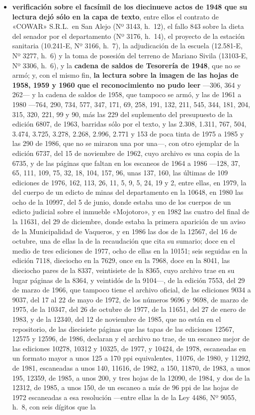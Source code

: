 \begin{itemize}[leftmargin=*]
\item \textbf{verificación sobre el facsímil de los diecinueve actos de 1948 que su lectura dejó sólo en la capa de texto}, entre ellos el contrato de «COWAR» S.R.L.\ en San Alejo (Nº 3143, h.\ 12), el fallo 843 sobre la dieta del senador por el departamento (Nº 3176, h.\ 14), el proyecto de la estación sanitaria (10.241-E, Nº 3166, h.\ 7), la adjudicación de la escuela (12.581-E, Nº 3277, h.\ 6) y la toma de posesión del terreno de Mariano Sivila (13103-E, Nº 3306, h.\ 6), y la \textbf{cadena de saldos de Tesorería de 1948}, que no se armó; y, con el mismo fin, \textbf{la lectura sobre la imagen de las hojas de 1958, 1959 y 1960 que el reconocimiento no pudo leer} ---306, 364 y 262--- y la cadena de saldos de 1958, que tampoco se armó, y las de 1961 a 1980 ---764, 290, 734, 577, 347, 171, 69, 258, 191, 132, 211, 545, 344, 181, 204, 315, 320, 221, 99 y 90, más las 229 del suplemento del presupuesto de la edición 6807, de 1963, barridas sólo por el texto, y las 2.308, 1.311, 767, 504, 3.474, 3.725, 3.278, 2.268, 2.996, 2.771 y 153 de poca tinta de 1975 a 1985 y las 290 de 1986, que no se miraron una por una---, con otro ejemplar de la edición 6737, del 15 de noviembre de 1962, cuyo archivo es una copia de la 6735, y de las páginas que faltan en los escaneos de 1964 a 1986 ---128, 37, 65, 111, 109, 75, 32, 18, 104, 157, 96, unas 137, 160, las últimas de 109 ediciones de 1976, 162, 113, 26, 11, 5, 9, 5, 24, 19 y 2, entre ellas, en 1979, la del cuerpo de un edicto de minas del departamento en la 10648, en 1980 las ocho de la 10997, del 5 de junio, donde estaba uno de los cuerpos de un edicto judicial sobre el inmueble «Mojotoro», y en 1982 las cuatro del final de la 11631, del 29 de diciembre, donde estaba la primera aparición de un aviso de la Municipalidad de Vaqueros, y en 1986 las dos de la 12567, del 16 de octubre, una de ellas la de la recaudación que cita su sumario; doce en el medio de tres ediciones de 1977, ocho de ellas en la 10151; seis seguidas en la edición 7118, dieciocho en la 7629, once en la 7968, doce en la 8041, las dieciocho pares de la 8337, veintisiete de la 8365, cuyo archivo trae en su lugar páginas de la 8364, y veintidós de la 9104---, de la edición 7553, del 29 de marzo de 1966, que tampoco tiene el archivo oficial, de las ediciones 9034 a 9037, del 17 al 22 de mayo de 1972, de los números 9696 y 9698, de marzo de 1975, de la 10347, del 26 de octubre de 1977, de la 11651, del 27 de enero de 1983, y de la 12340, del 12 de noviembre de 1985, que no están en el repositorio, de las diecisiete páginas que las tapas de las ediciones 12567, 12575 y 12596, de 1986, declaran y el archivo no trae, de un escaneo mejor de las ediciones 10278, 10312 y 10325, de 1977, y 10424, de 1978, escaneadas en un formato mayor a unos 125 a 170 ppi equivalentes, 11076, de 1980, y 11292, de 1981, escaneadas a unos 140, 11616, de 1982, a 150, 11870, de 1983, a unos 195, 12359, de 1985, a unos 200, y tres hojas de la 12090, de 1984, y dos de la 12312, de 1985, a unos 150, de un escaneo a más de 96 ppi de las hojas de 1972 escaneadas a esa resolución ---entre ellas la de la Ley 4486, Nº 9055, h.\ 8, con seis dígitos que la 
\end{itemize}
